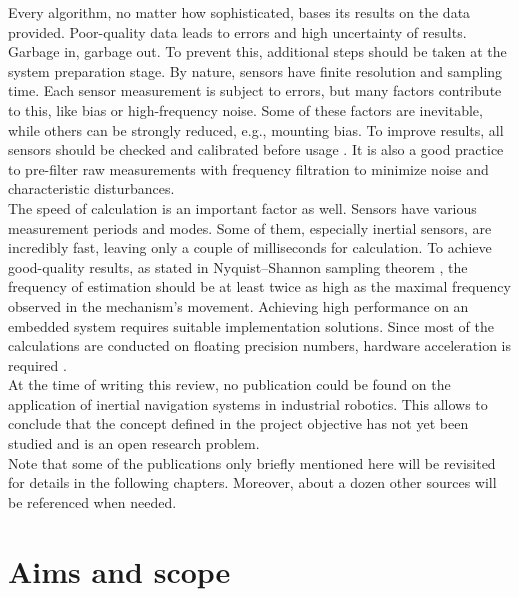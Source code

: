 Every algorithm, no matter how sophisticated, bases its results on the data provided. Poor-quality data leads to errors and high uncertainty of results. Garbage in, garbage out. To prevent this, additional steps should be taken at the system preparation stage. By nature, sensors have finite resolution and sampling time. Each sensor measurement is subject to errors, but many factors contribute to this, like bias or high-frequency noise. Some of these factors are inevitable, while others can be strongly reduced, e.g., mounting bias. To improve results, all sensors should be checked and calibrated before usage \cite{mi13060879} \cite{Hol_2011} \cite{gyro_calib}. It is also a good practice to pre-filter raw measurements with frequency filtration \cite{BADRI20101425} to minimize noise and characteristic disturbances. \\

The speed of calculation is an important factor as well. Sensors have various measurement periods and modes. Some of them, especially inertial sensors, are incredibly fast, leaving only a couple of milliseconds for calculation. To achieve good-quality results, as stated in Nyquist–Shannon sampling theorem \cite{sample_theorem}, the frequency of estimation should be at least twice as high as the maximal frequency observed in the mechanism's movement. Achieving high performance on an embedded system requires suitable implementation solutions. Since most of the calculations are conducted on floating precision numbers, hardware acceleration is required  \cite{fpu2} \cite{fpu}.\\

At the time of writing this review, no publication could be found on the application of inertial navigation systems in industrial robotics. This allows to conclude that the concept defined in the project objective has not yet been studied and is an open research problem.\\

Note that some of the publications only briefly mentioned here will be revisited for details in the following chapters. Moreover, about a dozen other sources will be referenced when needed.

\newpage
\section{Aims and scope}

